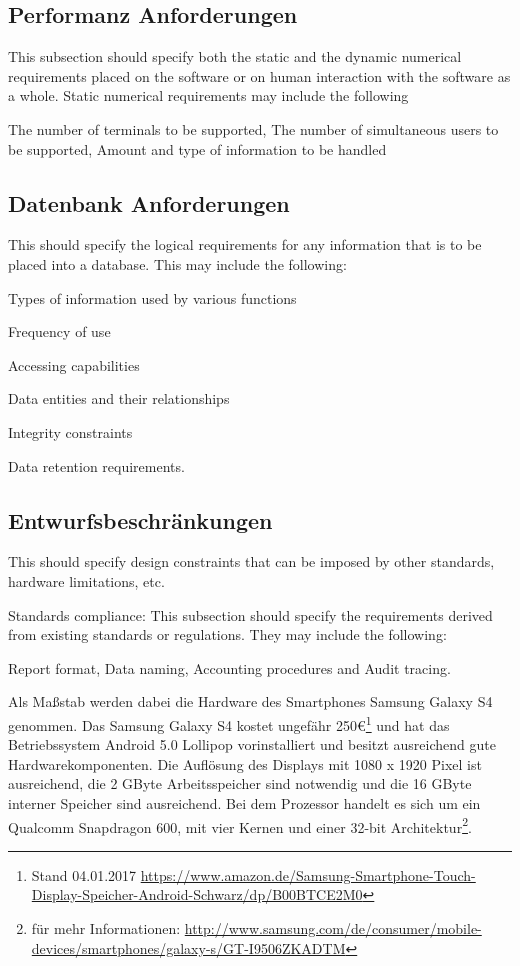 {	\subsection{Performanz Anforderungen}
		This subsection should specify both the static and the dynamic numerical requirements placed on the software or on human interaction with the software as a whole. Static numerical requirements may include the following
		
		The number of terminals to be supported, The number of simultaneous users to be supported, Amount and type of information to be handled
		
	\subsection{Datenbank Anforderungen}
		This should specify the logical requirements for any information that is to be placed into a database. This may include the following:
		
		Types of information used by various functions
		
		Frequency of use
		
		Accessing capabilities
		
		Data entities and their relationships
		
		Integrity constraints
		
		Data retention requirements.
	
	\subsection{Entwurfsbeschränkungen}
		This should specify design constraints that can be imposed by other standards, hardware limitations, etc.
		
		Standards compliance: This subsection should specify the requirements derived from existing standards or regulations. They may include the following: 
		
		Report format, Data naming, Accounting procedures and Audit tracing.
		
		Als Maßstab werden dabei die Hardware des Smartphones Samsung Galaxy S4 genommen. Das Samsung Galaxy S4 kostet ungefähr 250€\footnote{Stand 04.01.2017 \url{https://www.amazon.de/Samsung-Smartphone-Touch-Display-Speicher-Android-Schwarz/dp/B00BTCE2M0}} und hat das Betriebssystem Android 5.0 Lollipop vorinstalliert und besitzt ausreichend gute Hardwarekomponenten. Die Auflösung des Displays mit 1080 x 1920 Pixel ist ausreichend, die 2 GByte Arbeitsspeicher sind notwendig und die 16 GByte interner Speicher sind ausreichend. Bei dem Prozessor handelt es sich um ein Qualcomm Snapdragon 600, mit vier Kernen und einer 32-bit Architektur\footnote{für mehr Informationen: \url{http://www.samsung.com/de/consumer/mobile-devices/smartphones/galaxy-s/GT-I9506ZKADTM}}.
	
}
